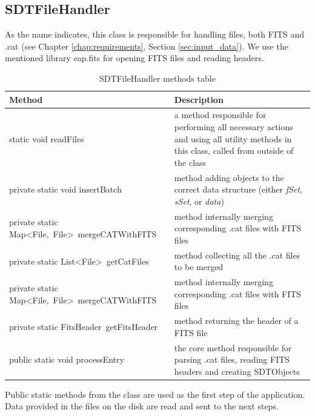 \subsection{SDTFileHandler}\label{sec:file_handler}

	As the name indicates, this class is responsible for handling files, both FITS and .cat (see Chapter \ref{chap:requirements}, Section \ref{sec:input_data}). We use the mentioned library eap.fits for opening FITS files and reading headers.
	
\begin{table}[H]
\centering
\setlength{\extrarowheight}{2pt}
\begin{tabularx}{\textwidth}{|X|X|}
\hline
\textbf{Method} & \textbf{Description} \\ \hline
static void \mbox{readFiles} & a method responsible for performing all necessary actions and using all utility methods in this class, called from outside of the class \\ \hline
private static void \mbox{insertBatch} & method adding objects to the correct data structure (either \emph{fSet}, \emph{sSet}, or \emph{data}) \\ \hline
private static \mbox{Map<File, File> mergeCATWithFITS} & method internally merging corresponding .cat files with FITS files \\ \hline
private static \mbox{List<File> getCatFiles} & method collecting all the .cat files to be merged \\ \hline
private static \mbox{Map<File, File> mergeCATWithFITS} & method internally merging corresponding .cat files with FITS files \\ \hline
private static \mbox{FitsHeader getFitsHeader} & method returning the header of a FITS file \\ \hline
public static void \mbox{processEntry} & the core method responsible for parsing .cat files, reading FITS headers and creating SDTObjects \\ \hline
\end{tabularx}
\caption{SDTFileHandler methods table}
\label{tab:class_methods_FH}
\end{table}

	Public static methods from the class are used as the first step of the application. Data provided in the files on the disk are read and sent to the next steps.
